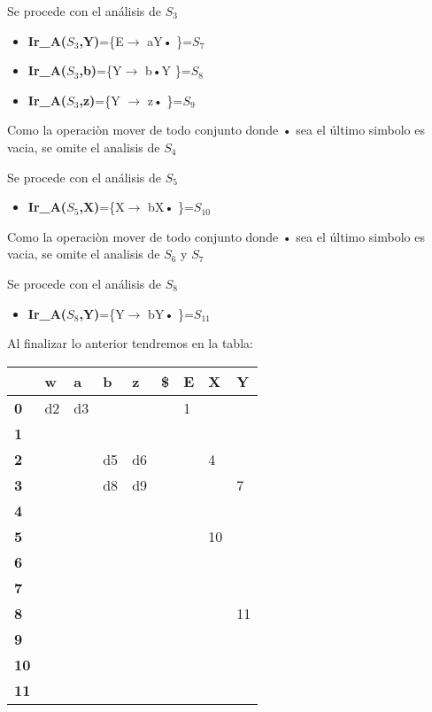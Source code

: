 \documentclass[11pt,a4paper]{article}
\begin{document}
Se procede con el análisis de $S_{3}$

\begin{itemize}
\item \textbf{Ir\_A($S_{3}$,Y)}=\{E$\longrightarrow$ aY• \}=\textit{$S_{7}$} 
\item \textbf{Ir\_A($S_{3}$,b)}=\{Y$\longrightarrow$ b•Y \}=\textit{$S_{8}$} 
\item \textbf{Ir\_A($S_{3}$,z)}=\{Y $\longrightarrow$ z• \}=\textit{$S_{9}$}
\end{itemize}

Como la operaciòn mover de todo conjunto donde • sea el último simbolo es vacia, se omite el analisis de $S_{4}$

Se procede con el análisis de $S_{5}$
\begin{itemize}
\item \textbf{Ir\_A($S_{5}$,X)}=\{X$\longrightarrow$ bX• \}=\textit{$S_{10}$} 
\end{itemize}

Como la operaciòn mover de todo conjunto donde • sea el último simbolo es vacia, se omite el analisis de $S_{6}$ y  $S_{7}$


Se procede con el análisis de $S_{8}$
\begin{itemize}
\item \textbf{Ir\_A($S_{8}$,Y)}=\{Y$\longrightarrow$ bY• \}=\textit{$S_{11}$} 
\end{itemize}

Al finalizar lo anterior tendremos en la tabla:

\begin{table}[h]
\begin{tabular}{|l|l|l|l|l|l|l|l|l|}
\hline
\textbf{} & \textbf{w} & \textbf{a} & \textbf{b} & \textbf{z} & \textbf{\$} & \textbf{E} & \textbf{X} & \textbf{Y} \\ \hline
\textbf{0} & d2 & d3 &  &  &  & 1 &  &  \\ \hline
\textbf{1} &  &  &  &  &  &  &  &  \\ \hline
\textbf{2} &  &  & d5 & d6 &  &  & 4 &  \\ \hline
\textbf{3} &  &  & d8 & d9 &  &  &  & 7 \\ \hline
\textbf{4} &  &  &  &  &  &  &  &  \\ \hline
\textbf{5} &  &  &  &  &  &  & 10 &  \\ \hline
\textbf{6} &  &  &  &  &  &  &  &  \\ \hline
\textbf{7} &  &  &  &  &  &  &  &  \\ \hline
\textbf{8} &  &  &  &  &  &  &  & 11 \\ \hline
\textbf{9} &  &  &  &  &  &  &  &  \\ \hline
\textbf{10} &  &  &  &  &  &  &  &  \\ \hline
\textbf{11} &  &  &  &  &  &  &  &  \\ \hline
\end{tabular}
\end{table}
\end{document}
